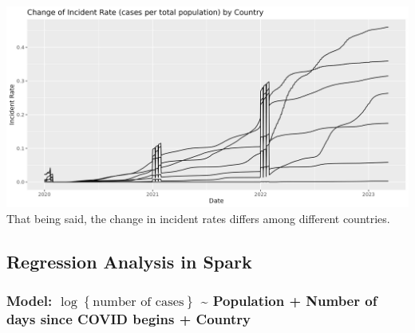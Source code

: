 \documentclass[
]{article}
\begin{document}
\includegraphics{../figures/fig3.jpeg} That being said, the change in
incident rates differs among different countries.

\hypertarget{regression-analysis-in-spark}{%
\subsection{Regression Analysis in
Spark}\label{regression-analysis-in-spark}}

\hypertarget{model-logleft-textnumber-of-cases-right-population-number-of-days-since-covid-begins-country}{%
\subsubsection{\texorpdfstring{Model:
\(\log\left\{ \text{number of cases} \right\}\) \textasciitilde{}
Population + Number of days since COVID begins +
Country}{Model: \textbackslash log\textbackslash left\textbackslash\{ \textbackslash text\{number of cases\} \textbackslash right\textbackslash\} \textasciitilde{} Population + Number of days since COVID begins + Country}}\label{model-logleft-textnumber-of-cases-right-population-number-of-days-since-covid-begins-country}}
\end{document}
